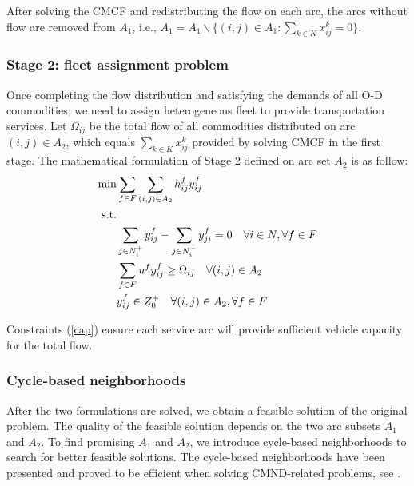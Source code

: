 \documentclass[11pt,nonblindrev,fleqn]{article}
\begin{document}
After solving the CMCF and redistributing the flow on each arc, the arcs without flow are removed from $A_1$, i.e., $A_1 = A_1 \backslash  \{ (i,j)\in A_1 : \sum_{k\in K} x_{ij}^k =0 \}$.

\subsubsection{Stage 2: fleet assignment problem}
Once completing the flow distribution and satisfying the demands of all O-D commodities, we need to assign heterogeneous fleet to provide transportation services. Let $\Omega_{ij}$ be the total flow of all commodities distributed on arc $(i,j) \in A_2$, which equals $\sum_{k\in K}x_{ij}^k$ provided by solving CMCF in the first stage. The mathematical formulation of Stage 2 defined on arc set $A_2$ is as follow:
\begin{align}
  \min & \sum_{f\in F}\sum_{(i,j)\in A_2} h_{ij}^f y_{ij}^f \\
    \rm{s.t.} & \nonumber \\
     & \sum_{j\in N_i^+}y_{ij}^f - \sum_{j\in N_i^-}y_{ji}^f = 0     \quad      \forall i\in N,\forall f\in F  \\
     & \sum_{f\in F} u^f y_{ij}^f \geq \Omega_{ij}      \quad       \forall (i,j)\in A_2   \label{cap} \\
     & y_{ij}^f \in Z_0^+       \quad       \forall (i,j)\in A_2, \forall f\in F
\end{align}

Constraints (\ref{cap}) ensure each service arc will provide sufficient vehicle capacity for the total flow.

\subsubsection{Cycle-based neighborhoods}
After the two formulations are solved, we obtain a feasible solution of the original problem. The quality of the feasible solution depends on the two arc subsets $A_1$ and $A_2$. To find promising $A_1$ and $A_2$, we introduce cycle-based neighborhoods to search for better feasible solutions. The cycle-based neighborhoods have been presented and proved to be efficient when solving CMND-related problems, see \cite{Ghamlouche2003Cycle, Ghamlouche2004Path,li2017design}.
\end{document}
